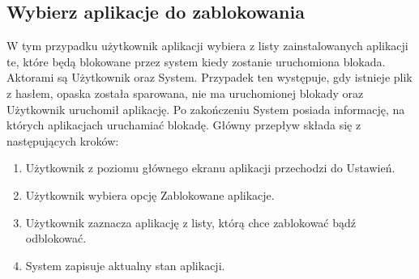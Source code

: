 \subsection{Wybierz aplikacje do zablokowania}
W tym przypadku użytkownik aplikacji wybiera z listy zainstalowanych aplikacji te, które będą blokowane przez system kiedy zostanie uruchomiona blokada. Aktorami są Użytkownik oraz System. Przypadek ten występuje, gdy istnieje plik z hasłem, opaska została sparowana, nie ma uruchomionej blokady oraz Użytkownik uruchomił aplikację. Po zakończeniu System posiada informację, na których aplikacjach uruchamiać blokadę. Główny przepływ składa się z następujących kroków:
\begin{enumerate}
    \item Użytkownik z poziomu głównego ekranu aplikacji przechodzi do Ustawień.
    \item Użytkownik wybiera opcję Zablokowane aplikacje.
    \item Użytkownik zaznacza aplikację z listy, którą chce zablokować bądź odblokować.
    \item System zapisuje aktualny stan aplikacji.
\end{enumerate}


